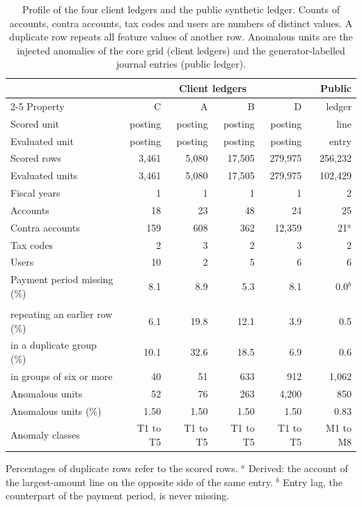 \begin{table}[tbp]
\caption{Profile of the four client ledgers and the public synthetic ledger. Counts of accounts, contra accounts, tax codes and users are numbers of distinct values. A duplicate row repeats all feature values of another row. Anomalous units are the injected anomalies of the core grid (client ledgers) and the generator-labelled journal entries (public ledger).}
\label{tab:data}
\centering
\footnotesize
\setlength{\tabcolsep}{4pt}
\begin{tabular}{@{}lrrrrr@{}}
\toprule
 & \multicolumn{4}{c}{Client ledgers} & Public \\
\cmidrule(lr){2-5}
Property & C & A & B & D & ledger \\
\midrule
Scored unit & posting & posting & posting & posting & line \\
Evaluated unit & posting & posting & posting & posting & entry \\
Scored rows & 3,461 & 5,080 & 17,505 & 279,975 & 256,232 \\
Evaluated units & 3,461 & 5,080 & 17,505 & 279,975 & 102,429 \\
Fiscal years & 1 & 1 & 1 & 1 & 2 \\
\addlinespace
Accounts & 18 & 23 & 48 & 24 & 25 \\
Contra accounts & 159 & 608 & 362 & 12,359 & 21$^{a}$ \\
Tax codes & 2 & 3 & 2 & 3 & 2 \\
Users & 10 & 2 & 5 & 6 & 6 \\
Payment period missing (\%) & 8.1 & 8.9 & 5.3 & 8.1 & 0.0$^{b}$ \\
\addlinespace
\multicolumn{6}{@{}l}{\textit{Duplicate rows}} \\
\quad repeating an earlier row (\%) & 6.1 & 19.8 & 12.1 & 3.9 & 0.5 \\
\quad in a duplicate group (\%) & 10.1 & 32.6 & 18.5 & 6.9 & 0.6 \\
\quad in groups of six or more & 40 & 51 & 633 & 912 & 1,062 \\
\addlinespace
Anomalous units & 52 & 76 & 263 & 4,200 & 850 \\
Anomalous units (\%) & 1.50 & 1.50 & 1.50 & 1.50 & 0.83 \\
Anomaly classes & T1 to T5 & T1 to T5 & T1 to T5 & T1 to T5 & M1 to M8 \\
\bottomrule
\end{tabular}
\par\smallskip\parbox{\linewidth}{\scriptsize Percentages of duplicate rows refer to the scored rows. $^{a}$ Derived: the account of the largest-amount line on the opposite side of the same entry. $^{b}$ Entry lag, the counterpart of the payment period, is never missing.}
\end{table}
